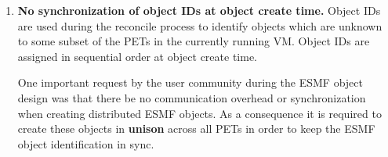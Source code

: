 %



\begin{enumerate}

\item{\bf No synchronization of object IDs at object create time.}
Object IDs are used during the reconcile process to identify objects
which are unknown to some subset of the PETs in the currently running VM.
Object IDs are assigned in sequential order at object create time.

One important request by the user community during the ESMF object design was
that there be no communication overhead or synchronization when creating
distributed ESMF objects. As a consequence it is required to create these
objects in {\bf unison} across all PETs in order to keep the ESMF object
identification in sync.

\end{enumerate}



